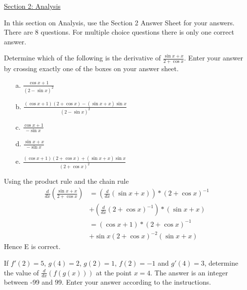 \documentclass{uob-cs-exam}
\begin{document}


\clearpage




\noindent
\begin{center}
    \underline{Section 2: Analysis}
\end{center}

In this section on Analysis, use the Section 2 Answer Sheet for your answers. There are 8 questions. 
For multiple choice questions there is only one correct answer.
\begin{questions}
\vspace*{2ex}

\vspace*{2ex}

\question[3] Determine which of the following is the derivative of $\frac{\sin x + x}{2 + \cos x}$. Enter your answer by crossing exactly one of the boxes on your answer sheet.
\begin{itemize}
\item[a.] $\frac{\cos x + 1}{(2-\sin x)^2}$ 
\item[b.] $\frac{(\cos x + 1)(2 + \cos x) - (\sin x+x)\sin x}{(2-\sin x)^2}$ 
\item[c.] $\frac{\cos x + 1}{-\sin x}$ 
\item[d.] $\frac{\sin x+x}{-\sin x}$ 
\item[e.] $\frac{(\cos x + 1)(2 + \cos x) + (\sin x+x)\sin x}{(2+\cos x)^2}$ 
\end{itemize}

\droppoints

\begin{solution}
Using the product rule and the chain rule
\begin{align*}
\frac{d}{dx} \left( \frac{\sin x + x}{2 + \cos x} \right) &= \left( \frac{d}{dx} \left( \sin x + x \right)\right)*(2+\cos x)^{-1} \\
&+ \left( \frac{d}{dx} (2+\cos x)^{-1}\right)* \left( \sin x + x \right)\\
&= (\cos x + 1)*(2+\cos x)^{-1} \\
&+ \sin x (2+\cos x)^{-2} \left( \sin x + x \right)
\end{align*}
Hence E is correct.
\end{solution}

\question[2]
If $f'(2)=5$, $g(4)=2$, $g(2)=1$, $f(2)=-1$ and $g'(4)=3$, determine the value of $\frac{d}{dx} \left( f(g(x)) \right)$ at the point $x=4$. The answer is an integer between -99 and 99. Enter your answer according to the instructions.


\end{questions}
\end{document}
